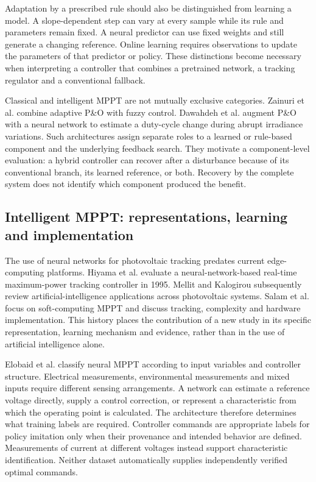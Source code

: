 \documentclass[Acad.Energy.,researcharticle,9pt,twoside,oneauthor]{Definitions/jams_academia}
\begin{document}
Adaptation by a prescribed rule should also be distinguished from learning a model. A slope-dependent step can vary at every sample while its rule and parameters remain fixed. A neural predictor can use fixed weights and still generate a changing reference. Online learning requires observations to update the parameters of that predictor or policy. These distinctions become necessary when interpreting a controller that combines a pretrained network, a tracking regulator and a conventional fallback.

Classical and intelligent MPPT are not mutually exclusive categories. Zainuri et al. \cite{zainuri} combine adaptive P\&O with fuzzy control. Dawahdeh et al. \cite{hybrid2024} augment P\&O with a neural network to estimate a duty-cycle change during abrupt irradiance variations. Such architectures assign separate roles to a learned or rule-based component and the underlying feedback search. They motivate a component-level evaluation: a hybrid controller can recover after a disturbance because of its conventional branch, its learned reference, or both. Recovery by the complete system does not identify which component produced the benefit.

\subsection{Intelligent MPPT: representations, learning and implementation}
The use of neural networks for photovoltaic tracking predates current edge-computing platforms. Hiyama et al. \cite{hiyama} evaluate a neural-network-based real-time maximum-power tracking controller in 1995. Mellit and Kalogirou \cite{mellit} subsequently review artificial-intelligence applications across photovoltaic systems. Salam et al. \cite{salam} focus on soft-computing MPPT and discuss tracking, complexity and hardware implementation. This history places the contribution of a new study in its specific representation, learning mechanism and evidence, rather than in the use of artificial intelligence alone.

Elobaid et al. \cite{elobaid} classify neural MPPT according to input variables and controller structure. Electrical measurements, environmental measurements and mixed inputs require different sensing arrangements. A network can estimate a reference voltage directly, supply a control correction, or represent a characteristic from which the operating point is calculated. The architecture therefore determines what training labels are required. Controller commands are appropriate labels for policy imitation only when their provenance and intended behavior are defined. Measurements of current at different voltages instead support characteristic identification. Neither dataset automatically supplies independently verified optimal commands.
\end{document}
